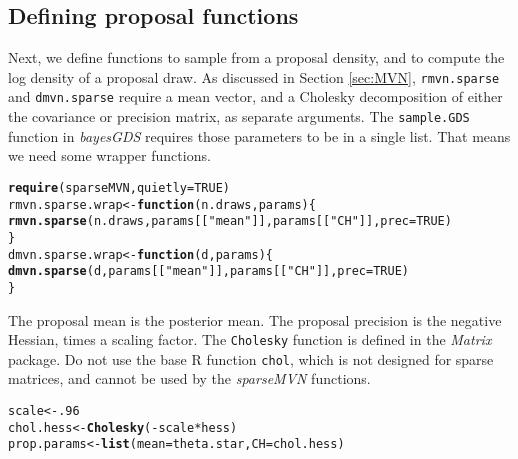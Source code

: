 \documentclass[10pt]{article}\usepackage[]{graphicx}\usepackage[]{color}
\makeatletter
\newcommand{\hlnum}[1]{\textcolor[rgb]{0.686,0.059,0.569}{#1}}%
\newcommand{\hlstr}[1]{\textcolor[rgb]{0.192,0.494,0.8}{#1}}%
\newcommand{\hlopt}[1]{\textcolor[rgb]{0,0,0}{#1}}%
\newcommand{\hlstd}[1]{\textcolor[rgb]{0.345,0.345,0.345}{#1}}%
\newcommand{\hlkwa}[1]{\textcolor[rgb]{0.161,0.373,0.58}{\textbf{#1}}}%
\newcommand{\hlkwb}[1]{\textcolor[rgb]{0.69,0.353,0.396}{#1}}%
\newcommand{\hlkwc}[1]{\textcolor[rgb]{0.333,0.667,0.333}{#1}}%
\newcommand{\hlkwd}[1]{\textcolor[rgb]{0.737,0.353,0.396}{\textbf{#1}}}%
\newenvironment{kframe}{%
 \def\at@end@of@kframe{}%
 \ifinner\ifhmode%
  \def\at@end@of@kframe{\end{minipage}}%
  \begin{minipage}{\columnwidth}%
 \fi\fi%
 \def\FrameCommand##1{\hskip\@totalleftmargin \hskip-\fboxsep
 \colorbox{shadecolor}{##1}\hskip-\fboxsep
     \hskip-\linewidth \hskip-\@totalleftmargin \hskip\columnwidth}%
 \MakeFramed {\advance\hsize-\width
   \@totalleftmargin\z@ \linewidth\hsize
   \@setminipage}}%
 {\par\unskip\endMakeFramed%
 \at@end@of@kframe}
\newenvironment{knitrout}{}{} %
\renewenvironment{knitrout}{\begin{singlespace}}{\end{singlespace}}
\newcommand{\pkg}[1]{\emph{#1}}
\newcommand{\proglang}[1]{\textsf{#1}}
\newcommand{\func}[1]{\texttt{#1}}
\makeatother
\begin{document}
\subsection{Defining proposal functions}

Next, we define functions to sample from a proposal density, and to
compute the log density of a proposal draw.  As discussed in Section
\ref{sec:MVN}, \func{rmvn.sparse} and \func{dmvn.sparse} require a mean
vector, and a Cholesky decomposition of either the covariance or
precision matrix, as separate arguments.  The \func{sample.GDS}
function in \pkg{bayesGDS} requires those parameters to be in a single
list.  That means we need some wrapper functions.

\begin{knitrout}
\color{fgcolor}\begin{kframe}
\begin{alltt}
\hlkwd{require}\hlstd{(sparseMVN,} \hlkwc{quietly}\hlstd{=}\hlnum{TRUE}\hlstd{)}
\hlstd{rmvn.sparse.wrap} \hlkwb{<-} \hlkwa{function}\hlstd{(}\hlkwc{n.draws}\hlstd{,} \hlkwc{params}\hlstd{) \{}
    \hlkwd{rmvn.sparse}\hlstd{(n.draws, params[[}\hlstr{"mean"}\hlstd{]], params[[}\hlstr{"CH"}\hlstd{]],} \hlkwc{prec}\hlstd{=}\hlnum{TRUE}\hlstd{)}
\hlstd{\}}
\hlstd{dmvn.sparse.wrap} \hlkwb{<-} \hlkwa{function}\hlstd{(}\hlkwc{d}\hlstd{,} \hlkwc{params}\hlstd{) \{}
    \hlkwd{dmvn.sparse}\hlstd{(d, params[[}\hlstr{"mean"}\hlstd{]], params[[}\hlstr{"CH"}\hlstd{]],} \hlkwc{prec}\hlstd{=}\hlnum{TRUE}\hlstd{)}
\hlstd{\}}
\end{alltt}
\end{kframe}
\end{knitrout}

The proposal mean is
the posterior mean.  The proposal precision is the negative Hessian,
times a scaling factor.  The \func{Cholesky} function is defined in
the \pkg{Matrix} package.  Do not use the base \proglang{R} function
\func{chol}, which is not designed for sparse matrices, and cannot be
used by the \pkg{sparseMVN} functions.


\begin{knitrout}
\color{fgcolor}\begin{kframe}
\begin{alltt}
\hlstd{scale} \hlkwb{<-} \hlnum{.96}
\hlstd{chol.hess} \hlkwb{<-} \hlkwd{Cholesky}\hlstd{(}\hlopt{-}\hlstd{scale}\hlopt{*}\hlstd{hess)}
\hlstd{prop.params} \hlkwb{<-} \hlkwd{list}\hlstd{(}\hlkwc{mean} \hlstd{= theta.star,} \hlkwc{CH} \hlstd{= chol.hess)}
\end{alltt}
\end{kframe}
\end{knitrout}
\end{document}
